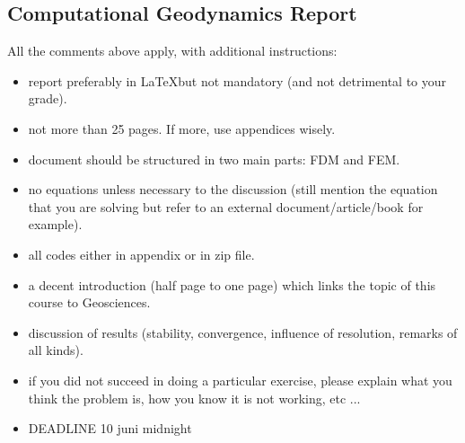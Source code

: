 \subsection{Computational Geodynamics Report}

All the comments above apply, with additional instructions:
\begin{itemize}
\item report preferably in \LaTeX but not mandatory (and not detrimental to your grade).
\item not more than 25 pages. If more, use appendices wisely.
\item document should be structured in two main parts: FDM and FEM.
\item no equations unless necessary to the discussion (still mention the equation that 
you are solving but refer to an external document/article/book for example).
\item all codes either in appendix or in zip file.
\item a decent introduction (half page to one page) which links the topic of this course to Geosciences.
\item discussion of results (stability, convergence, influence of resolution, remarks of all kinds).
\item if you did not succeed in doing a particular exercise, please explain what you think the problem is, 
how you know it is not working, etc ...
\item DEADLINE 10 juni midnight 
\end{itemize}









